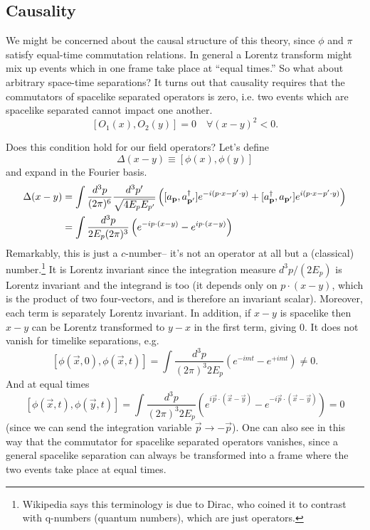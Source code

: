 \subsection*{Causality} We might be concerned about the causal structure of this theory, since $\phi$ and $\pi$ satisfy equal-time commutation relations. In general a Lorentz transform might mix up events which in one frame take place at ``equal times.'' So what about arbitrary space-time separations? It turns out that causality requires that the commutators of spacelike separated operators is zero, i.e. two events which are spacelike separated cannot impact one another.
$$[O_1(x),O_2(y)]=0 \quad\forall (x-y)^2 <0.$$

Does this condition hold for our field operators? Let's define
$$\Delta(x-y)\equiv [\phi(x),\phi(y)]$$
and expand in the Fourier basis.
\begin{align*}
\Delta(x-y) &= \int \frac{d^3p}{(2\pi)^6} \frac{d^3p'}{\sqrt{4E_p E_{p'}}} \left([a_{\boldsymbol{\mathbf{p}}},a_{\boldsymbol{\mathbf{p}}'}^\dagger] e^{-i(p\cdot x - p' \cdot y)}+[a_{\boldsymbol{\mathbf{p}}}^\dagger, a_{\boldsymbol{\mathbf{p}}'}] e^{i(p\cdot x-p' \cdot y)}\right)\\
&= \int \frac{d^3p}{2E_p(2\pi)^3}\left(e^{-ip\cdot (x-y)}-e^{i p \cdot (x-y)}\right)
\end{align*}
Remarkably, this is just a $c$-number-- it's not an operator at all but a (classical) number.\footnote{Wikipedia says this terminology is due to Dirac, who coined it to contrast with q-numbers (quantum numbers), which are just operators.} It is Lorentz invariant since the integration measure $d^3p/(2E_p)$ is Lorentz invariant and the integrand is too (it depends only on $p\cdot (x-y)$, which is the product of two four-vectors, and is therefore an invariant scalar). Moreover, each term is separately Lorentz invariant. In addition, if $x-y$ is spacelike then $x-y$ can be Lorentz transformed to $y-x$ in the first term, giving $0$. It does not vanish for timelike separations, e.g.
$$[\phi (\vec x,0), \phi(\vec x,t)] = \int \frac{d^3p}{(2\pi)^3 2 E_p}(e^{-imt}-e^{+imt})\neq 0.$$
And at equal times 
$$[\phi(\vec x,t),\phi(\vec y, t)]=\int \frac{d^3p}{(2\pi)^3 2E_p}(e^{i\vec p \cdot (\vec x - \vec y)}- e^{-i \vec p \cdot (\vec x- \vec y)})=0$$
(since we can send the integration variable $\vec p\to -\vec p$). One can also see in this way that the commutator for spacelike separated operators vanishes, since a general spacelike separation can always be transformed into a frame where the two events take place at equal times.

